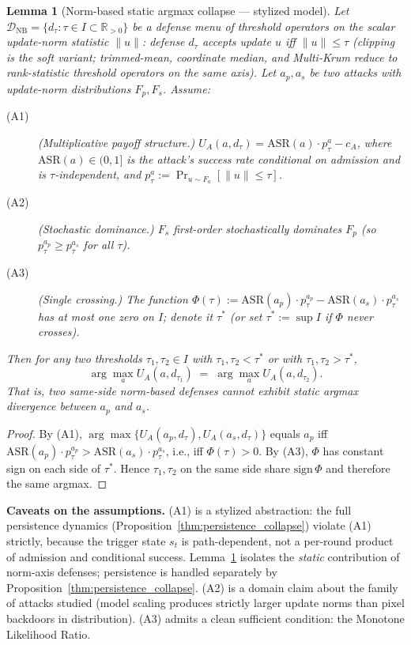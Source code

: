 \documentclass{article}
\newtheorem{lemma}{Lemma}
\begin{document}
\begin{lemma}[Norm-based static argmax collapse --- stylized model]
\label{lem:dichotomy}
Let $\mathcal{D}_{\mathrm{NB}} = \{d_\tau : \tau \in I \subset \mathbb{R}_{>0}\}$ be a defense menu of threshold operators on the scalar update-norm statistic $\|u\|$: defense $d_\tau$ accepts update $u$ iff $\|u\| \leq \tau$ (clipping is the soft variant; trimmed-mean, coordinate median, and Multi-Krum reduce to rank-statistic threshold operators on the same axis). Let $a_p, a_s$ be two attacks with update-norm distributions $F_p, F_s$. Assume:
\begin{description}
\item[(A1)] (\emph{Multiplicative payoff structure.}) $U_A(a, d_\tau) = \mathrm{ASR}(a) \cdot p^a_\tau - c_A$, where $\mathrm{ASR}(a) \in (0, 1]$ is the attack's success rate \emph{conditional on admission} and is $\tau$-independent, and $p^a_\tau := \Pr_{u \sim F_a}[\|u\| \leq \tau]$.
\item[(A2)] (\emph{Stochastic dominance.}) $F_s$ first-order stochastically dominates $F_p$ (so $p^{a_p}_\tau \geq p^{a_s}_\tau$ for all $\tau$).
\item[(A3)] (\emph{Single crossing.}) The function $\Phi(\tau) := \mathrm{ASR}(a_p) \cdot p^{a_p}_\tau - \mathrm{ASR}(a_s) \cdot p^{a_s}_\tau$ has at most one zero on $I$; denote it $\tau^*$ (or set $\tau^* := \sup I$ if $\Phi$ never crosses).
\end{description}
Then for any two thresholds $\tau_1, \tau_2 \in I$ with $\tau_1, \tau_2 < \tau^*$ or with $\tau_1, \tau_2 > \tau^*$,
\[
\arg\max_a U_A(a, d_{\tau_1}) \;=\; \arg\max_a U_A(a, d_{\tau_2}).
\]
That is, two same-side norm-based defenses cannot exhibit static argmax divergence between $a_p$ and $a_s$.
\end{lemma}

\begin{proof}
By (A1), $\arg\max\{U_A(a_p, d_\tau), U_A(a_s, d_\tau)\}$ equals $a_p$ iff $\mathrm{ASR}(a_p) \cdot p^{a_p}_\tau > \mathrm{ASR}(a_s) \cdot p^{a_s}_\tau$, i.e., iff $\Phi(\tau) > 0$. By (A3), $\Phi$ has constant sign on each side of $\tau^*$. Hence $\tau_1, \tau_2$ on the same side share $\mathrm{sign}\,\Phi$ and therefore the same argmax. \qedhere
\end{proof}

\textbf{Caveats on the assumptions.} (A1) is a stylized abstraction: the full persistence dynamics (Proposition~\ref{thm:persistence_collapse}) violate (A1) strictly, because the trigger state $s_t$ is path-dependent, not a per-round product of admission and conditional success. Lemma~\ref{lem:dichotomy} isolates the \emph{static} contribution of norm-axis defenses; persistence is handled separately by Proposition~\ref{thm:persistence_collapse}. (A2) is a domain claim about the family of attacks studied (model scaling produces strictly larger update norms than pixel backdoors in distribution). (A3) admits a clean sufficient condition: the Monotone Likelihood Ratio.
\end{document}
